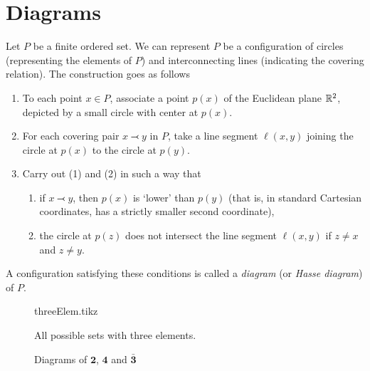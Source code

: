 \documentclass[../main-sheet.tex]{subfiles}
\begin{document}
\section{Diagrams}
Let \(P\) be a finite ordered set. We can represent \(P\) be a configuration of circles (representing the elements of \(P\)) and interconnecting lines (indicating the covering relation).
The construction goes as follows
\begin{enumerate}
    \item To each point \(x\in P\), associate a point \(p(x)\) of the Euclidean plane \(\mathbb{R}^2\), depicted by a small circle with center at \(p(x)\).
    \item For each covering pair \(x \lefttail y\) in \(P\), take a line segment \(\ell(x, y)\) joining the circle at \(p(x)\) to the circle at \(p(y)\).
    \item Carry out (1) and (2) in such a way that
    \begin{enumerate}
        \item if \(x \lefttail y\), then \(p(x)\) is `lower' than \(p(y)\) (that is, in standard Cartesian coordinates, has a strictly smaller second coordinate),
        \item the circle at \(p(z)\) does not intersect the line segment \(\ell(x, y)\) if \(z \neq x\) and \(z \neq y\).
    \end{enumerate}
\end{enumerate}
A configuration satisfying these conditions is called a \emph{diagram} (or \emph{Hasse diagram}) of \(P\).
\begin{figure}[H]
    \centering
    {threeElem.tikz}
    \caption{All possible sets with three elements.}
\end{figure}
\begin{figure}[H]
    \centering
    \caption{Diagrams of \(\mathbf{2}\), \(\mathbf{4}\) and \(\bar{\mathbf{3}}\)}
\end{figure}
\end{document}
